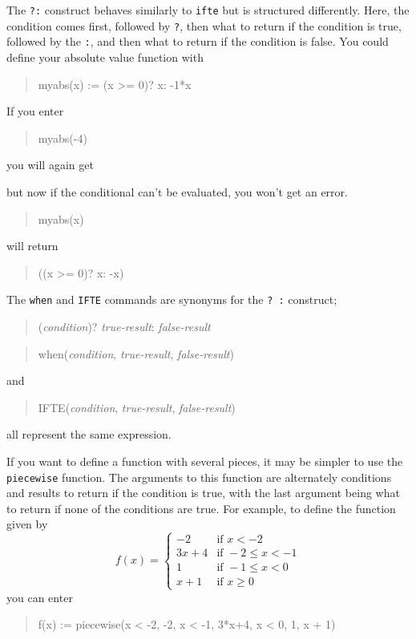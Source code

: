 \documentclass[a4paper,11pt]{book}
\newenvironment{giaccmd}
{\begin{quote}\ttfamily}
{\end{quote}}
\begin{document}
The \texttt{?:} construct behaves similarly to \texttt{ifte} but is
structured differently.  Here, the condition comes first, followed by
\texttt{?}, then what to return if the condition is true, followed by
the \texttt{:}, and then what to return if the condition is false.
You could define your absolute value function with
\begin{giaccmd}
  myabs(x) := (x >= 0)? x: -1*x
\end{giaccmd}
If you enter
\begin{giaccmd}
  myabs(-4)
\end{giaccmd}
you will again get
\begin{giaccmd}
  4
\end{giaccmd}
but now if the conditional can't be evaluated, you won't get an error.
\begin{giaccmd}
  myabs(x)
\end{giaccmd}
will return
\begin{giaccmd}
  ((x >= 0)? x: -x)
\end{giaccmd}

The \texttt{when} and \texttt{IFTE} commands
are synonyms for the \texttt{? :} construct; 
\begin{giaccmd}
  (\textit{condition})? \textit{true-result}: \textit{false-result}
\end{giaccmd}
\begin{giaccmd}
  when(\textit{condition}, \textit{true-result}, \textit{false-result})
\end{giaccmd}
and
\begin{giaccmd}
  IFTE(\textit{condition}, \textit{true-result}, \textit{false-result})
\end{giaccmd}
all represent the same expression.

If you want to define a function with several pieces, it may be
simpler to use the \texttt{piecewise} function.  The
arguments to this function are alternately conditions and results to
return if the condition is true, with the last argument being what to
return if none of the conditions are true.  For example, to define the
function given by
\[
f(x) = 
\begin{cases}
-2 & \text{if } x < -2\\
3x+4 & \text{if } -2 \le x < -1\\
1 & \text{if } -1 \le x < 0\\
x + 1 & \text{if } x \ge 0
\end{cases}
\]
you can enter
\begin{giaccmd}
  f(x) := piecewise(x < -2, -2, x < -1, 3*x+4, x < 0, 1, x + 1)
\end{giaccmd}
\end{document}
